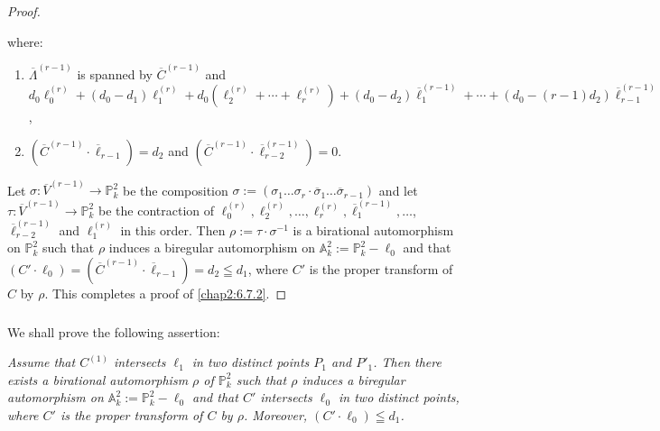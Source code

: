 \begin{proof}
\begin{enumerate}
\begin{figure}[H]
\end{figure}
where:\pageoriginale\
\begin{enumerate}
\renewcommand{\theenumii}{\roman{enumii}}
\renewcommand{\labelenumii}{\rm(\theenumii)}
\item $\overline{\Lambda}^{(r-1)}$ is spanned by
  $\overline{C}^{(r-1)}$ and
  $d_{0}\ell_{0}^{(r)}+(d_{0}-d_{1})\ell^{(r)}_{1}+d_{0}(\ell^{(r)}_{2}+\cdots+\ell^{(r)}_{r})+(d_{0}-d_{2})\overline{\ell}_{1}^{(r-1)}+\cdots+(d_{0}-(r-1)d_{2})\overline{\ell}^{(r-1)}_{r-1}$, 

\item $(\overline{C}^{(r-1)}\cdot \overline{\ell}_{r-1})=d_{2}$ and
  $(\overline{C}^{(r-1)}\cdot \overline{\ell}^{(r-1)}_{r-2})=0$. 
\end{enumerate}
\end{enumerate}

Let $\sigma:\overline{V}^{(r-1)}\to \mathbb{P}^{2}_{k}$ be the
composition $\sigma:=(\sigma_{1}\ldots\sigma_{r}\cdot
\overline{\sigma}_{1}\ldots\overline{\sigma}_{r-1})$ and let
$\tau:\overline{V}^{(r-1)}\to \mathbb{P}^{2}_{k}$ be the contraction
of
$\ell^{(r)}_{0},\ell^{(r)}_{2},\ldots,\ell^{(r)}_{r},\overline{\ell}^{(r-1)}_{1},\ldots$,
$\overline{\ell}^{(r-1)}_{r-2}$
and $\ell^{(r)}_{1}$ in this order. Then $\rho:=\tau\cdot\sigma^{-1}$
is a birational automorphism on $\mathbb{P}^{2}_{k}$ such that $\rho$
induces a biregular automorphism on
$\mathbb{A}^{2}_{k}:=\mathbb{P}^{2}_{k}-\ell_{0}$ and that
$(C'\cdot\ell_{0})=(\overline{C}^{(r-1)}\cdot\overline{\ell}_{r-1})=d_{2}\leqq
d_{1}$, where $C'$ is the proper transform of $C$ by $\rho$. This
completes a proof of \ref{chap2:6.7.2}.
\end{proof}

\subsubsection{}\label{chap2:6.7.3}
We shall prove the following assertion:

{\em Assume that $C^{(1)}$ intersects $\ell_{1}$ in two distinct
  points $P_{1}$ and $P'_{1}$. Then there exists a birational
  automorphism $\rho$ of $\mathbb{P}^{2}_{k}$ such that $\rho$ induces
  a biregular automorphism on
  $\mathbb{A}^{2}_{k}:=\mathbb{P}^{2}_{k}-\ell_{0}$ and that $C'$
  intersects $\ell_{0}$ in two distinct points, where $C'$ is the
  proper transform of $C$ by $\rho$. Moreover, $(C'\cdot\ell_{0})\leqq
  d_{1}$.}

